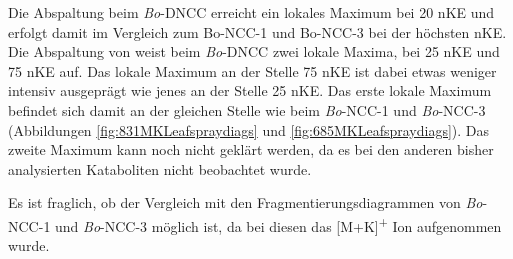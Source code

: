 Die  Abspaltung beim \textit{Bo}-DNCC erreicht ein lokales Maximum bei 20 \gls{nKE} und erfolgt damit im Vergleich zum Bo-NCC-1 und Bo-NCC-3 bei der höchsten \gls{nKE}. Die Abspaltung von  weist beim \textit{Bo}-DNCC zwei lokale Maxima, bei 25 \gls{nKE} und 75 \gls{nKE} auf. Das lokale Maximum an der Stelle 75 \gls{nKE} ist dabei etwas weniger intensiv ausgeprägt wie jenes an der Stelle 25 \gls{nKE}. Das erste lokale Maximum befindet sich damit an der gleichen Stelle wie beim \textit{Bo}-NCC-1 und \textit{Bo}-NCC-3 (Abbildungen \ref{fig:831MKLeafspraydiags} und \ref{fig:685MKLeafspraydiags}). Das zweite Maximum kann noch nicht geklärt werden, da es bei den anderen bisher analysierten Kataboliten nicht beobachtet wurde.

Es ist fraglich, ob der Vergleich mit den Fragmentierungsdiagrammen von \textit{Bo}-NCC-1 und \textit{Bo}-NCC-3 möglich ist, da bei diesen das [M+K]\textsuperscript{+} Ion aufgenommen wurde.
